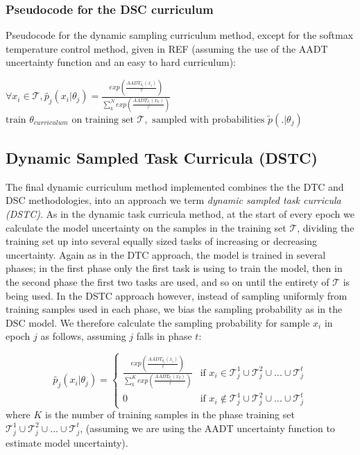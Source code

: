 \subsubsection{Pseudocode for the DSC curriculum}\label{sec:DSCPseudocode}
Pseudocode for the dynamic sampling curriculum method, except for the softmax temperature control method, given in REF (assuming the use of the AADT uncertainty function and an easy to hard curriculum):
\begin{algorithmic}
\STATE $\forall x_i \in \mathcal{T}, \tilde{p_j}(x_i | \theta_j) = \frac{exp(\frac{AADT_{\theta_j}(x_i)}{\tau})}{\sum_{k}^{N} exp(\frac{AADT_{\theta_j}(x_k)}{\tau})}$
\STATE $\text{train }  \theta_{curriculum} \text{ on training set } \mathcal{T}, \text{ sampled with probabilities }  \tilde{p}(. | \theta_j)  $
\ENDFOR
\end{algorithmic}

\subsection{Dynamic Sampled Task Curricula (DSTC)}
The final dynamic curriculum method implemented combines the the DTC and DSC methodologies, into an approach we term \textit{dynamic sampled task curricula (DSTC)}. As in the dynamic task curricula method, at the start of every epoch we calculate the model uncertainty on the samples in the training set  $\mathcal{T}$, dividing the training set up into several equally sized tasks of increasing or decreasing uncertainty. Again as in the DTC approach, the model is trained in several phases; in the first phase only the first task is using to train the model, then in the second phase the first two tasks are used, and so on until the entirety of $\mathcal{T}$ is being used. In the DSTC approach however, instead of sampling uniformly from training samples used in each phase, we bias the sampling probability as in the DSC model. We therefore calculate the sampling probability for sample $x_i$ in epoch $j$ as follows, assuming $j$ falls in phase $t$:

\begin{equation}\label{eq:DSC_Prob}
\tilde{p_j}(x_i | \theta_j) = 
\begin{cases} 
\frac{exp(\frac{AADT_{\theta_j}(x_i)}{\tau})}{\sum_{k}^{K} exp(\frac{AADT_{\theta_j}(x_k)}{\tau})} & \text{if } x_i \in \mathcal{T}_j^1 \cup \mathcal{T}_j^2 \cup ... \cup \mathcal{T}_j^t \\
0 & \text{if } x_i  \notin \mathcal{T}_j^1 \cup \mathcal{T}_j^2 \cup ... \cup \mathcal{T}_j^t
\end{cases}
\end{equation}
where $K$ is the number of training samples in the phase training set $\mathcal{T}_j^1 \cup \mathcal{T}_j^2 \cup ... \cup \mathcal{T}_j^t$, (assuming we are using the AADT uncertainty function to estimate model uncertainty).

